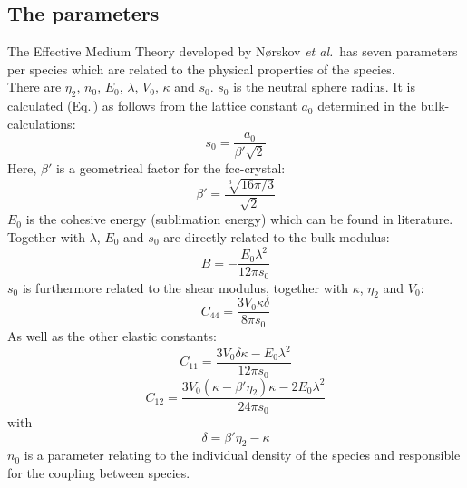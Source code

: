 \documentclass[twoside, 11pt, titlepage, captions=nooneline, a4paper, headsepline]{scrbook}%
\begin{document}
\subsection{The parameters}
The Effective Medium Theory developed by N\o rskov \emph{et al.}\,\cite{jacobsen1996,jacobsen1987} has seven parameters per species which are related to the physical properties of the species.\\
There are $\eta_2$, $n_0$, $E_0$, $\lambda$, $V_0$, $\kappa$ and $s_0$.
$s_0$ is the neutral sphere radius. It is calculated (Eq.\,) as follows from the lattice constant $a_0$ determined in the bulk-calculations:
\begin{equation}
s_0 = \frac{a_0}{\beta' \sqrt{2}}
\end{equation}
Here, $\beta'$ is a geometrical factor for the fcc-crystal:
\begin{equation}
\beta' = \frac{\sqrt[3]{16 \pi /3}}{\sqrt{2}}
\end{equation}
$E_0$ is the cohesive energy (sublimation energy) which can be found in literature. 
Together with $\lambda$, $E_0$ and $s_0$ are directly related to the bulk modulus:\\
\begin{equation}
B = -\frac{E_0 \lambda^2}{12 \pi s_0}
\end{equation}
$s_0$ is furthermore related to the shear modulus, together with $\kappa$, $\eta_2$ and $V_0$:\\
\begin{equation}
C_{44} = \frac{3 V_0 \kappa \delta}{8\pi s_0}
\label{c44}
\end{equation}
As well as the other elastic constants:
\begin{equation}
C_{11}=\frac{3 V_0 \delta \kappa -E_0 \lambda^2}{12 \pi s_0}
\end{equation}
\begin{equation}
C_{12}=\frac{3 V_0(\kappa-\beta'\eta_2)\kappa-2E_0\lambda^2}{24\pi s_0}
\end{equation}
with 
\begin{equation}
\delta = \beta'\eta_2-\kappa
\end{equation}
$n_0$ is a parameter relating to the individual density of the species and responsible for the coupling between species.\\
\end{document}
